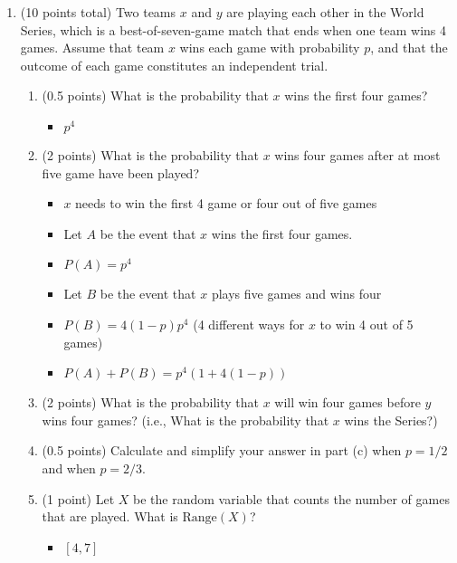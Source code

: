 \documentclass[11pt]{article}
\newcommand{\Range}{{\mathrm{Range}}}
\begin{document}
\begin{enumerate}

\item (10 points total) Two teams $x$ and $y$ are playing each other in the
World Series, which is a best-of-seven-game match that ends when one
team wins 4 games.  Assume that team $x$ wins each game with probability
$p$, and that the outcome of each game constitutes an independent trial.

\begin{enumerate}
\item (0.5 points) What is the probability that $x$ wins the first four games?

\begin{itemize}
	\item $p^{4}$
\end{itemize}

\item (2 points) What is the probability that $x$ wins four games after
at most five game have been played?
\begin{itemize}
	\item $x$ needs to win the first 4 game or four out of five games
	\item Let $A$ be the event that $x$ wins the first four games.
	\item $P(A) = p^{4}$
	\item Let $B$ be the event that $x$ plays five games and wins four
	\item $P(B) = 4(1-p)p^{4}$ (4 different ways for $x$ to win 4 out of 5 
	games)
	\item $P(A) + P(B) = p^{4}(1 + 4(1-p))$
\end{itemize}

\item (2 points) What is the probability that $x$ will win four games before
$y$ wins four games?  (i.e., What is the probability that $x$ wins
the Series?)

\item (0.5 points) Calculate and simplify your answer in part (c) when $p=1/2$
and when $p=2/3$.

\item (1 point) Let $X$ be the random variable that counts the number of games
that are played.  What is $\Range(X)$?

\begin{itemize}
	\item $[4, 7]$
\end{itemize}


\end{enumerate}
\end{enumerate}
\end{document}
